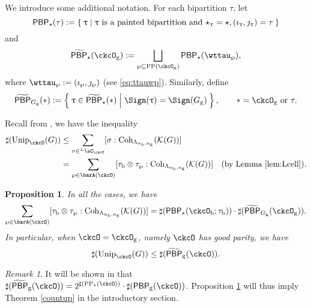 \documentclass[12pt,a4paper]{amsart}
\newcommand{\CK}{{\mathcal {K}}}
\numberwithin{equation}{section}
\newtheorem{prop}[thm]{Proposition}
\theoremstyle{remark}
\newtheorem{remark}[thm]{Remark}
\def\Unip{\mathrm{Unip}}
\def\LC{{}^{\scriptscriptstyle L}\sC}
\def\Coh{\mathrm{Coh}}
\def\CPP{\mathrm{PP}}
\def\CPPs{\mathrm{PP}_{\star}}
\def\tPBP{\widetilde{\mathsf{PBP}}}
\def\PBP{\mathsf{PBP}}
\def\ckcOg{\ckcO_{\mathrm g}}
\def\tPBP{\widetilde{\mathsf{PBP}}}
\begin{document}
We introduce some additional notation. For each bipartition $\tau$, let
\[
  \PBP_{\star}(\tau) := \Set{ \uptau|\uptau \text{ is a painted bipartition and
    } \star_{\uptau}=\star, (\imath_{\uptau},\jmath_{\uptau}) = \tau}
\]
and
\[
  \tPBP_{\star}(\ckcO_{\mathrm g}) := %
  \bigsqcup_{\wp \subseteq \CPP(\ckcO_{\mathrm g})}\PBP_{\star}(\wttau_{\wp}),
\]
where $\wttau_{\wp} := (\imath_{\wp},\jmath_{\wp})$ (see \eqref{eq:ttauwp}). Similarly, define
\[
  \tPBP_{G_{\mathrm g}}(\ast):= \Set{\uptau\in \tPBP_{\star}(\ast )|\Sign(\uptau)= \Sign(G_{\mathrm g})}, \quad  \quad
  \ast  = \ckcO_{\mathrm g} \text{ or } \tau.
\]

Recall from , we have the inequality
\[
\begin{split}
\sharp (\Unip_{\ckcO}(G))&\leq \sum_{\sigma\in \LC_{\ckcO}} [\sigma: \Coh_{\Lambda_{n_{\mathrm b},n_{\mathrm g}}}(\CK(G))]\\
  & =\sum_{\wp\in \barA(\ckcO)} [\tau_{\mathrm b}\otimes \tau_{\wp}: \Coh_{\Lambda_{n_{\mathrm b},n_{\mathrm g}}}(\CK(G))] \quad (\textrm{by Lemma \ref{lem:Lcell}}).
\end{split}
\]


\begin{prop}\label{prop:countBCD}
  In all the cases, we have
  \[
  \sum_{\wp\in \barA(\ckcO)} [\tau_{\mathrm b}\otimes \tau_{\wp}: \Coh_{\Lambda_{n_{\mathrm b},n_{\mathrm g}}}(\CK(G))]
      = \sharp (\PBP_{\star}(\ckcO_{\mathrm b};\tau _{\mathrm b}))\cdot \sharp(\tPBP_{G_{\mathrm g}}(\ckcO_{\mathrm g})).
  \]
 In particular, when $\ckcO = \ckcO_{\mathrm g}$, namely $\ckcO $ has good parity, we have
  \[
  \sharp (\Unip_{\ckcO}(G))\leq
     \sharp ({\tPBP_{\mathrm g}(\ckcO)}).
  \]
 \end{prop}

 \begin{remark} It will be shown in  that $\sharp(\tPBP_{\mathrm g}(\ckcO)) = 2^{\sharp(\CPPs(\ckcO))}\cdot \sharp(\PBP_{\mathrm g}(\ckcO))$. Proposition \ref{prop:countBCD} will thus imply Theorem \ref{countup} in the introductory section.
 \end{remark}
\end{document}
